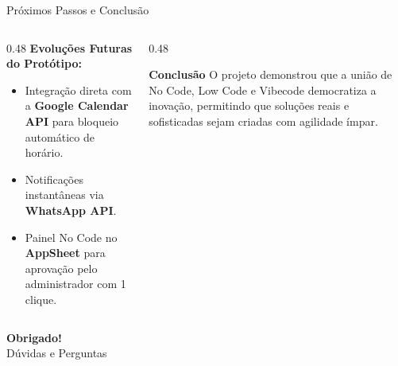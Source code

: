 \documentclass[aspectratio=169, 10pt]{beamer}
\begin{document}
\begin{frame}{Próximos Passos e Conclusão}
    \begin{columns}[T]
        \begin{column}{0.48\textwidth}
            \textbf{Evoluções Futuras do Protótipo:}
            \begin{itemize}
                \item Integração direta com a \textbf{Google Calendar API} para bloqueio automático de horário.
                \item Notificações instantâneas via \textbf{WhatsApp API}.
                \item Painel No Code no \textbf{AppSheet} para aprovação pelo administrador com 1 clique.
            \end{itemize}
        \end{column}

        \begin{column}{0.48\textwidth}
            \begin{block}{\textbf{Conclusão}}
                O projeto demonstrou que a união de No Code, Low Code e Vibecode democratiza a inovação, permitindo que soluções reais e sofisticadas sejam criadas com agilidade ímpar.
            \end{block}
        \end{column}
    \end{columns}

    \vspace{0.5cm}
    \begin{center}
        \large \textbf{Obrigado!} \\
        \normalsize Dúvidas e Perguntas
    \end{center}
\end{frame}
\end{document}
